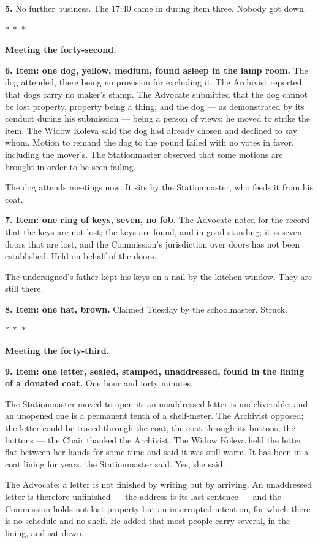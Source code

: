 \documentclass[11pt]{article}
\newcommand{\separator}{\begin{center}\vspace{4pt}$\ast\ \ast\ \ast$\vspace{4pt}\end{center}}
\begin{document}
\textbf{5.} No further business. The 17:40 came in during item three. Nobody got down.

\separator

\textbf{Meeting the forty-second.}

\textbf{6. Item: one dog, yellow, medium, found asleep in the lamp room.} The dog attended, there being no provision for excluding it. The Archivist reported that dogs carry no maker's stamp. The Advocate submitted that the dog cannot be lost property, property being a thing, and the dog — as demonstrated by its conduct during his submission — being a person of views; he moved to strike the item. The Widow Koleva said the dog had already chosen and declined to say whom. Motion to remand the dog to the pound failed with no votes in favor, including the mover's. The Stationmaster observed that some motions are brought in order to be seen failing.

The dog attends meetings now. It sits by the Stationmaster, who feeds it from his coat.

\textbf{7. Item: one ring of keys, seven, no fob.} The Advocate noted for the record that the keys are not lost; the keys are found, and in good standing; it is seven doors that are lost, and the Commission's jurisdiction over doors has not been established. Held on behalf of the doors.

The undersigned's father kept his keys on a nail by the kitchen window. They are still there.

\textbf{8. Item: one hat, brown.} Claimed Tuesday by the schoolmaster. Struck.

\separator

\textbf{Meeting the forty-third.}

\textbf{9. Item: one letter, sealed, stamped, unaddressed, found in the lining of a donated coat.} One hour and forty minutes.

The Stationmaster moved to open it: an unaddressed letter is undeliverable, and an unopened one is a permanent tenth of a shelf-meter. The Archivist opposed; the letter could be traced through the coat, the coat through its buttons, the buttons — the Chair thanked the Archivist. The Widow Koleva held the letter flat between her hands for some time and said it was still warm. It has been in a coat lining for years, the Stationmaster said. Yes, she said.

The Advocate: a letter is not finished by writing but by arriving. An unaddressed letter is therefore unfinished — the address is its last sentence — and the Commission holds not lost property but an interrupted intention, for which there is no schedule and no shelf. He added that most people carry several, in the lining, and sat down.
\end{document}
